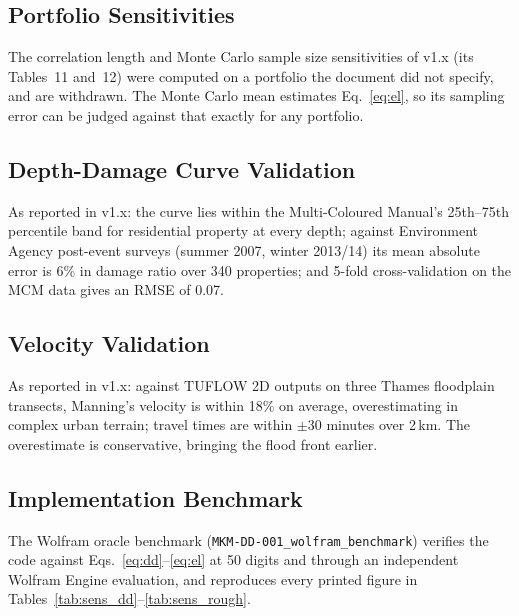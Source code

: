 \documentclass[11pt,a4paper]{article}
\begin{document}
\subsection{Portfolio Sensitivities}
The correlation length and Monte Carlo sample size sensitivities of v1.x (its Tables~11
and~12) were computed on a portfolio the document did not specify, and are withdrawn. The
Monte Carlo mean estimates Eq.~\eqref{eq:el}, so its sampling error can be judged against
that exactly for any portfolio.

\mkmvalidation

\subsection{Depth-Damage Curve Validation}
As reported in v1.x: the curve lies within the Multi-Coloured Manual's 25th--75th
percentile band for residential property at every depth; against Environment Agency
post-event surveys (summer 2007, winter 2013/14) its mean absolute error is 6\% in
damage ratio over 340 properties; and 5-fold cross-validation on the MCM data gives an
RMSE of 0.07.

\subsection{Velocity Validation}
As reported in v1.x: against TUFLOW 2D outputs on three Thames floodplain transects,
Manning's velocity is within 18\% on average, overestimating in complex urban terrain;
travel times are within $\pm$30 minutes over 2\,km. The overestimate is conservative,
bringing the flood front earlier.

\subsection{Implementation Benchmark}
The Wolfram oracle benchmark (\texttt{MKM-DD-001\_wolfram\_benchmark}) verifies the code
against Eqs.~\eqref{eq:dd}--\eqref{eq:el} at 50 digits and through an independent Wolfram
Engine evaluation, and reproduces every printed figure in
Tables~\ref{tab:sens_dd}--\ref{tab:sens_rough}.

\mkmlimitations
\end{document}
